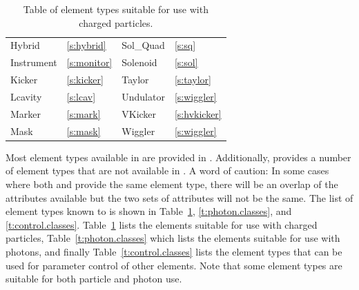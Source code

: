 \begin{table}[htb]
{\begin{tabular}{llll}
  Hybrid            & \ref{s:hybrid}      &  Sol_Quad          & \ref{s:sq}       \\
  Instrument        & \ref{s:monitor}     &  Solenoid          & \ref{s:sol}      \\
  Kicker            & \ref{s:kicker}      &  Taylor            & \ref{s:taylor}   \\
  Lcavity           & \ref{s:lcav}        &  Undulator         & \ref{s:wiggler}  \\
  Marker            & \ref{s:mark}        &  VKicker           & \ref{s:hvkicker} \\  
  Mask              & \ref{s:mask}        &  Wiggler           & \ref{s:wiggler}  \\ \bottomrule
\end{tabular}
}
\caption{Table of element types suitable for use with charged particles.}
\label{t:particle.classes}\center
\end{table}

Most element types available in \mad are provided in \bmad.
Additionally, \bmad provides a number of element types that are not
available in \mad.  A word of caution: In some cases where both \mad
and \bmad provide the same element type, there will be an overlap of
the attributes available but the two sets of attributes will not be
the same.  The list of element types known to \bmad is shown in
Table~\ref{t:particle.classes}, \ref{t:photon.classes}, and
\ref{t:control.classes}.  Table~\ref{t:particle.classes} lists the
elements suitable for use with charged particles,
Table~\ref{t:photon.classes} which lists the elements suitable for use
with photons, and finally Table~\ref{t:control.classes} lists the
 element types that can be used for parameter control
of other elements. Note that some element types are suitable for both
particle and photon use.

